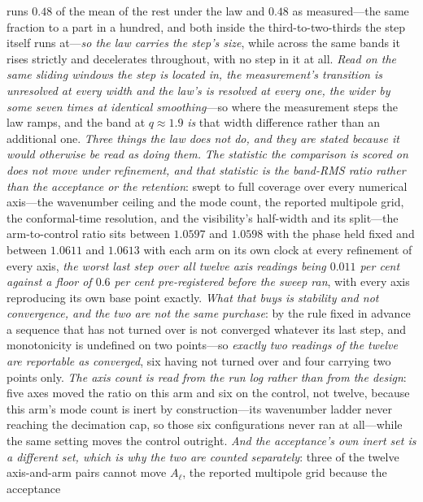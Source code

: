 \documentclass[11pt,a4paper]{article}
\theoremstyle{plain}
\theoremstyle{definition}
\theoremstyle{remark}
\begin{document}
runs $0.48$ of the mean of the rest under the law and $0.48$ as measured---the same fraction to a part in a
hundred, and both inside the third-to-two-thirds the step itself runs at---\emph{so the law carries the step's
size}, while across the same bands it rises strictly and decelerates throughout, with no step in it at all.
\emph{Read on the same sliding windows the step is located in, the measurement's transition is unresolved at
every width and the law's is resolved at every one, the wider by some seven times at identical smoothing}---so
where the measurement steps the law ramps, and the band at $q\approx1.9$ \emph{is} that width difference rather
than an additional one.
\emph{Three things the law does not do, and they are stated because it would otherwise be read as doing them.}
\emph{The statistic the comparison is scored on does not move under refinement, and that statistic is the
band-RMS ratio rather than the acceptance or the retention}: swept to full coverage over every numerical axis---the
wavenumber ceiling and the mode count, the reported multipole grid, the conformal-time resolution, and the
visibility's half-width and its split---the arm-to-control ratio sits between $1.0597$ and $1.0598$ with the phase held fixed and between $1.0611$ and
$1.0613$ with each arm on its own clock at every refinement of every axis, \emph{the worst last step over all twelve axis readings
being $0.011$ per cent against a floor of $0.6$ per cent pre-registered before the sweep ran}, with every axis
reproducing its own base point exactly. \emph{What that buys is stability and not convergence, and the two
are not the same purchase}: by the rule fixed in advance a sequence that has not turned over is not converged
whatever its last step, and monotonicity is undefined on two points---so \emph{exactly two readings of the twelve
are reportable as converged}, six having not turned over and four carrying two points only. \emph{The axis count
is read from the run log rather than from the design}: five axes moved the ratio on this arm and six on the
control, not twelve, because this arm's mode count is inert by construction---its wavenumber ladder never reaching
the decimation cap, so those six configurations never ran at all---while the same setting moves the control
outright. \emph{And the acceptance's own inert set is a different set, which is why the two are counted
separately}: three of the twelve axis-and-arm pairs cannot move $A_{\ell}$, the reported multipole grid because the acceptance
\end{document}
